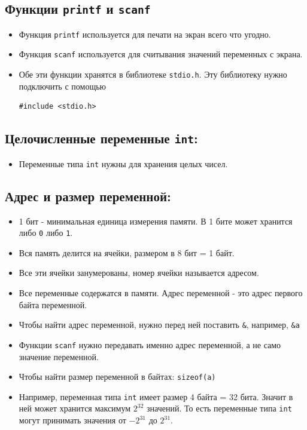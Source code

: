 \documentclass{article}
\begin{document}
\subsection*{Функции \texttt{printf} и \texttt{scanf}}
\begin{itemize}
\item Функция \texttt{printf} используется для печати на экран всего что угодно.
\item Функция \texttt{scanf} используется для считывания значений переменных с экрана.
\item Обе эти функции хранятся в библиотеке \texttt{stdio.h}. Эту библиотеку нужно подключить с помощью
\begin{lstlisting}
#include <stdio.h>
\end{lstlisting}
\end{itemize}

\subsection*{Целочисленные переменные \texttt{int}:}
\begin{itemize}
\item Переменные типа \texttt{int} нужны для хранения целых чисел.
\end{itemize}


\subsection*{Адрес и размер переменной:}
\begin{itemize}
\item 1 бит - минимальная единица измерения памяти. В 1 бите может хранится либо \texttt{0} либо \texttt{1}.
\item Вся память делится на ячейки, размером в 8 бит = 1 байт.
\item Все эти ячейки занумерованы, номер ячейки называется адресом.
\item Все переменные содержатся в памяти. Адрес переменной - это адрес первого байта переменной.
\item Чтобы найти адрес переменной, нужно перед ней поставить \texttt{\&}, например, \texttt{\&a}
\item Функции \texttt{scanf} нужно передавать именно адрес переменной, а не само значение переменной.
\item Чтобы найти размер переменной в байтах: \texttt{sizeof(a)}
\item Например, переменная типа \texttt{int} имеет размер 4 байта = 32 бита. Значит в ней может хранится максимум $2^{32}$ значений. То есть переменные типа \texttt{int} могут принимать значения от $-2^{31}$ до $2^{31}$.
\end{itemize}
\end{document}
